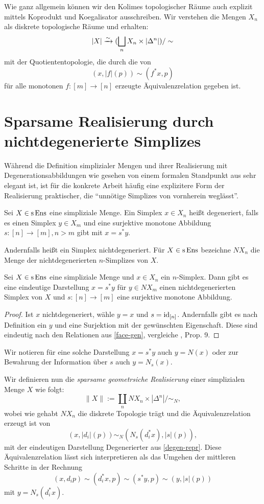 Wie ganz allgemein können wir den Kolimes topologischer Räume auch
explizit mittels Koprodukt und Koegalisator ausschreiben. Wir
verstehen die Mengen $X_n$ als diskrete topologische Räume und
erhalten:
\[ |X| \xrightarrow[]{\sim} (\bigsqcup_n X_n \times |\Delta^n|) / \sim \]
mit der Quotiententopologie, die durch die von
\[ (x, |f|(p)) \sim (f^* x, p) \]
für alle monotonen $f: [m] \to [n]$ erzeugte Äquivalenzrelation
gegeben ist.

\section{Sparsame Realisierung durch nichtdegenerierte Simplizes}

Während die Definition simplizialer Mengen und ihrer Realisierung mit
Degenerationsabbildungen wie gesehen von einem formalen Standpunkt aus
sehr elegant ist, ist für die konkrete Arbeit häufig eine explizitere
Form der Realisierung praktischer, die ``unnötige Simplizes von
vornherein weglässt''.
\begin{defn}[\cite{GM}, I.2.9]
  Sei $X \in \operatorname{s}\operatorname{Ens}$ eine simpliziale Menge. Ein Simplex $x \in X_n$
  heißt degeneriert, falls es einen Simplex $y \in X_m$ und eine
  surjektive monotone Abbildung $s: [n] \to [m], n > m$ gibt mit $x =
  s^* y$.
\end{defn}
Andernfalls heißt ein Simplex nichtdegeneriert. Für $X \in \operatorname{s}\operatorname{Ens}$
bezeichne $NX_n$ die Menge der nichtdegenerierten $n$-Simplizes von
$X$.
\begin{lemma} \label{degen-repr}
  Sei $X \in \operatorname{s}\operatorname{Ens}$ eine simpliziale Menge und $x \in X_n$ ein
  $n$-Simplex. Dann gibt es eine eindeutige Darstellung $x = s^* y$
  für $y \in NX_m$ einen nichtdegenerierten Simplex von $X$ und $s:
  [n] \to [m]$ eine surjektive monotone Abbildung.
\end{lemma}
\begin{proof}
  Ist $x$ nichtdegeneriert, wähle $y = x$ und $s =
  \operatorname{id}_{[n]}$. Andernfalls gibt es nach Definition ein $y$ und eine
  Surjektion mit der gewünschten Eigenschaft. Diese sind eindeutig
  nach den Relationen aus \ref{face-gen}, vergleiche \cite{MIT},
  Prop. 9.
\end{proof}
Wir notieren für eine solche Darstellung $x = s^* y$ auch $y = N(x)$
oder zur Bewahrung der Information über $s$ auch $y = N_s(x)$.

Wir definieren nun die \emph{sparsame geometrsiche Realisierung} einer
simplizialen Menge $X$ wie folgt:
\[ \| X \| := \coprod_n NX_n \times |\Delta^n| / \sim_N ,\]
wobei wie gehabt $NX_n$ die diskrete Topologie trägt und die
Äquivalenzrelation erzeugt ist von
\[ (x, |d_i|(p)) \sim_N (N_s(d_i^* x), |s|(p)), \]
mit der eindeutigen Darstellung Degenerierter aus
\ref{degen-repr}. Diese Äquivalenzrelation lässt sich interpretieren
als das Umgehen der mittleren Schritte in der Rechnung
\[ (x, d_i p) \sim (d_i^* x, p) \sim (s^* y, p)
   \sim (y, |s|(p)) \]
mit $y = N_s(d_i^* x)$.
   
